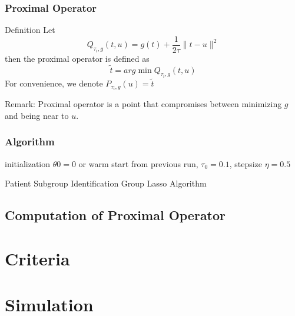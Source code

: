 \documentclass{beamer}
\begin{document}
    
    \begin{frame}
    \frametitle{Proximal Operator}
    \begin{block}{Definition}
    Let $$Q_{\tau_i,g}(t,u)=g(t)+\frac{1}{2\tau}\parallel t-u\parallel^2$$
    then the proximal operator is defined as $$\tilde{t}=arg\min Q_{\tau_i,g}(t,u)$$
    For convenience, we denote $P_{\tau_i,g}(u)=\tilde{t}$
    \end{block}
    Remark: Proximal operator is a point that compromises between minimizing $g$ and being near to $u$. 
    \end{frame}
    
    \begin{frame}
    \frametitle{Algorithm}
    \begin{algorithm}[H]
     initialization $\theta0=0$ or warm start from previous run, $\tau_0=0.1$, stepsize $\eta=0.5$\;
     \caption{Patient Subgroup Identification Group Lasso Algorithm}
    \end{algorithm}
    
    
    \end{frame}
    
    \subsection{Computation of Proximal Operator}
    
   
    
    
    \section{Criteria}
    
    \section{Simulation}
    
\end{document}
